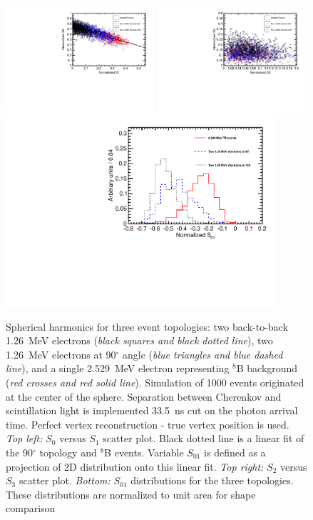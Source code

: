 \begin{figure}[h]
  \centering
  \includegraphics[width=0.49\textwidth]{plots/hS0vsS1_topologies_allLight_VtxSmear0cm_VtxShiftX0cm_33p5ns_center.pdf}
  \includegraphics[width=0.49\textwidth]{plots/hS2vsS3_topologies_allLight_VtxSmear0cm_VtxShiftX0cm_33p5ns_center.pdf}
  \includegraphics[width=0.9\textwidth]{plots/hS01_topologies_allLight_VtxSmear0cm_VtxShiftX0cm_33p5ns_center.pdf}
  \caption{Spherical harmonics for three event topologies: two
    back-to-back 1.26~MeV electrons (\emph{black squares and black
      dotted line}), two 1.26~MeV electrons at 90$^{\circ}$ angle
    (\emph{blue triangles and blue dashed line}), and a single
    2.529~MeV electron representing $^{8}$B background (\emph{red
      crosses and red solid line}). Simulation of 1000 events
    originated at the center of the sphere. Separation between
    Cherenkov and scintillation light is implemented 33.5~ns cut on
    the photon arrival time. Perfect vertex reconstruction - true
    vertex position is used. \emph{Top left:} $S_0$ versus $S_1$
    scatter plot. Black dotted line is a linear fit of the
    90$^{\circ}$ topology and $^{8}$B events. Variable $S_{01}$ is
    defined as a projection of 2D distribution onto this linear
    fit. \emph{Top right:} $S_2$ versus $S_3$ scatter
    plot. \emph{Bottom:} $S_{01}$ distributions for the three
    topologies. These distributions are normalized to unit area for
    shape comparison}
\label{fig:SL_topologies_all}
\end{figure}

